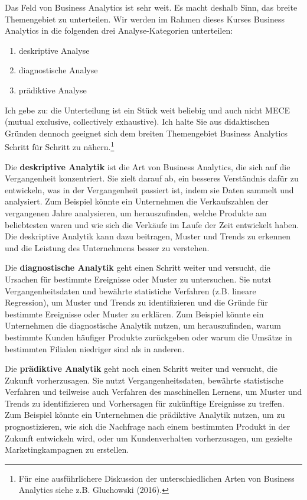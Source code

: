 \documentclass[
  letterpaper,
  DIV=11]{scrreprt}
\begin{document}
Das Feld von Business Analytics ist sehr weit. Es macht deshalb Sinn,
das breite Themengebiet zu unterteilen. Wir werden im Rahmen dieses
Kurses Business Analytics in die folgenden drei Analyse-Kategorien
unterteilen:

\begin{enumerate}
\def\labelenumi{\arabic{enumi}.}
\item
  deskriptive Analyse
\item
  diagnostische Analyse
\item
  prädiktive Analyse
\end{enumerate}

Ich gebe zu: die Unterteilung ist ein Stück weit beliebig und auch nicht
MECE (mutual exclusive, collectively exhaustive). Ich halte Sie aus
didaktischen Gründen dennoch geeignet sich dem breiten Themengebiet
Business Analytics Schritt für Schritt zu nähern.\footnote{Für eine
  ausführlichere Diskussion der unterschiedlichen Arten von Business
  Analytics siehe z.B. Gluchowski (2016).}

Die \textbf{deskriptive Analytik} ist die Art von Business Analytics,
die sich auf die Vergangenheit konzentriert. Sie zielt darauf ab, ein
besseres Verständnis dafür zu entwickeln, was in der Vergangenheit
passiert ist, indem sie Daten sammelt und analysiert. Zum Beispiel
könnte ein Unternehmen die Verkaufszahlen der vergangenen Jahre
analysieren, um herauszufinden, welche Produkte am beliebtesten waren
und wie sich die Verkäufe im Laufe der Zeit entwickelt haben. Die
deskriptive Analytik kann dazu beitragen, Muster und Trends zu erkennen
und die Leistung des Unternehmens besser zu verstehen.

Die \textbf{diagnostische Analytik} geht einen Schritt weiter und
versucht, die Ursachen für bestimmte Ereignisse oder Muster zu
untersuchen. Sie nutzt Vergangenheitsdaten und bewährte statistiche
Verfahren (z.B. lineare Regression), um Muster und Trends zu
identifizieren und die Gründe für bestimmte Ereignisse oder Muster zu
erklären. Zum Beispiel könnte ein Unternehmen die diagnostische Analytik
nutzen, um herauszufinden, warum bestimmte Kunden häufiger Produkte
zurückgeben oder warum die Umsätze in bestimmten Filialen niedriger sind
als in anderen.

Die \textbf{prädiktive Analytik} geht noch einen Schritt weiter und
versucht, die Zukunft vorherzusagen. Sie nutzt Vergangenheitsdaten,
bewährte statistische Verfahren und teilweise auch Verfahren des
maschinellen Lernens, um Muster und Trends zu identifizieren und
Vorhersagen für zukünftige Ereignisse zu treffen. Zum Beispiel könnte
ein Unternehmen die prädiktive Analytik nutzen, um zu prognostizieren,
wie sich die Nachfrage nach einem bestimmten Produkt in der Zukunft
entwickeln wird, oder um Kundenverhalten vorherzusagen, um gezielte
Marketingkampagnen zu erstellen.
\end{document}
